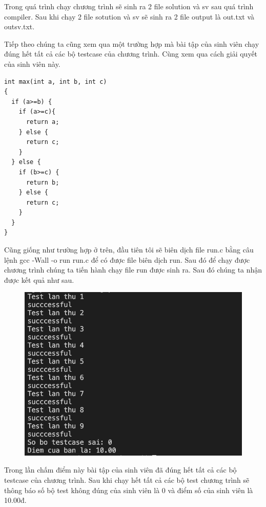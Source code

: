 \documentclass[12pt,a4paper]{article}
\begin{document}
Trong quá trình chạy chương trình sẽ sinh ra 2 file solution và sv sau quá trình compiler. Sau khi chạy 2 file sotution và sv sẽ sinh ra 2 file output là out.txt và outsv.txt.

Tiếp theo chúng ta cũng xem qua một trường hợp mà bài tập của sinh viên chạy đúng hết tất cả các bộ testcase của chương trình. Cùng xem qua cách giải quyết của sinh viên này.

\begin{lstlisting}
int max(int a, int b, int c) 
{ 
  if (a>=b) {
    if (a>=c){
      return a;
    } else {
      return c;
    } 
  } else {
    if (b>=c) {
      return b;
    } else {
      return c;  
    }
  }
}
\end{lstlisting}

Cũng giống như trường hợp ở trên, đầu tiên tôi sẽ biên dịch file run.c bằng câu lệnh gcc -Wall -o run run.c để có được file biên dịch run. Sau đó để chạy được chương trình chúng ta tiến hành chạy file run được sinh ra. Sau đó chúng ta nhận được kết quả như sau.

\begin{figure}[ht]
\begin{center}
\includegraphics[scale=.3]{hinhanh/ketquademodung.png}
\end{center}
\end{figure}

Trong lần chấm điểm này bài tập của sinh viên đã đúng hết tất cả các bộ testcase của chương trình. Sau khi chạy hết tất cả các bộ test chương trình sẽ thông báo số bộ test không đúng của sinh viên là 0 và điểm số của sinh viên là 10.00đ.
\end{document}
